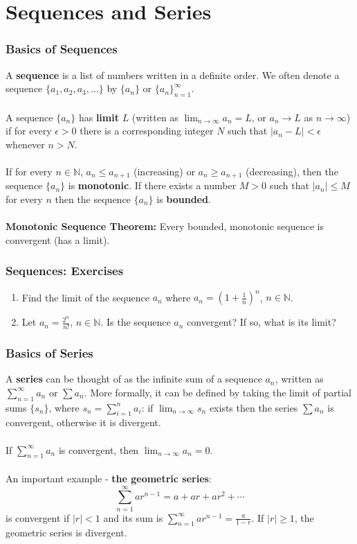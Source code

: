 \documentclass{beamer}
\begin{document}

\section{Sequences and Series}
\begin{frame}
\frametitle{Basics of Sequences}
A \textbf{sequence }is a list of numbers written in a definite order. We often denote a sequence $\{a_1,a_2,a_3,\ldots\}$ by $\{a_n\}$ or $\{a_n\}_{n=1}^{\infty}$.
\\~\\
A sequence $\{a_n\}$ has \textbf{limit} $L$ (written as $\lim_{n \rightarrow \infty} a_n = L$, or $a_n \rightarrow L$ as $n\rightarrow \infty$) if for every $\epsilon > 0$ there is a corresponding integer $N$ such that $\vert a_n - L \vert < \epsilon$ whenever $n > N$.
\\~\\
If for every $n \in \mathbb{N}$, $a_n \leq a_{n+1}$ (increasing) or $a_n \geq a_{n+1}$ (decreasing), then the sequence $\{a_n\}$ is \textbf{monotonic}. If there exists a number $M > 0$ such that $\vert a_n \vert \leq M$ for every $n$ then the sequence $\{a_n\}$ is \textbf{bounded}.
\\~\\
\textbf{Monotonic Sequence Theorem:} Every bounded, monotonic sequence is convergent (has a limit).
\end{frame}

\begin{frame}
\frametitle{Sequences: Exercises}
\begin{enumerate}
\item Find the limit of the sequence ${a_n}$ where $a_n = \left(1+\frac{1}{n}\right)^n$, $n \in \mathbb{N}$.
\vspace*{1.2in}
\item Let $a_n = \frac{2^n}{n!}$, $n \in \mathbb{N}$. Is the sequence ${a_n}$ convergent? If so, what is its limit?
\vspace*{1.2in}
\end{enumerate}
\end{frame}

\begin{frame}
\frametitle{Basics of Series}
A \textbf{series} can be thought of as the infinite sum of a sequence ${a_n}$, written as $\sum_{n=1}^{\infty} a_n$ or $\sum a_n$. More formally, it can be defined by taking the limit of partial sums $\{s_n\}$, where $s_n = \sum_{i=1}^{n} a_i$: if $\lim_{n \rightarrow \infty} s_n$ exists then the series $\sum a_n$ is convergent, otherwise it is divergent.
\\~\\
If $\sum_{n=1}^{\infty} a_n$ is convergent, then $\lim_{n \rightarrow \infty} a_n = 0$.
\\~\\
An important example - \textbf{the geometric series}:\\
$$
\sum_{n=1}^{\infty} ar^{n-1} = a + ar + ar^2 + \cdots
$$
is convergent if $\vert r \vert < 1$ and its sum is 
$\sum_{n=1}^{\infty} ar^{n-1} = \frac{a}{1-r}$.
If $\vert r \vert \geq 1$, the geometric series is divergent.
\end{frame}
\end{document}
